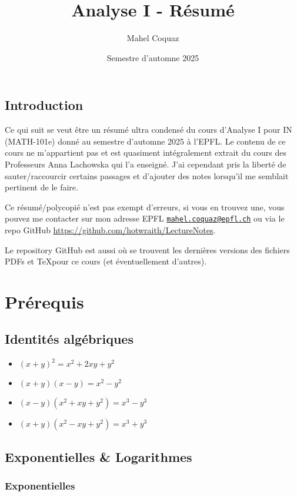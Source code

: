 \documentclass[10pt,a4paper]{book}
\title{Analyse I \vspace{0.2cm} - Résumé}
\author{Mahel Coquaz}
\date{Semestre d'automne 2025}
\begin{document}
\maketitle
\tableofcontents
\newpage

\section*{Introduction}

Ce qui suit se veut être un résumé ultra condensé du cours d'Analyse I pour IN (MATH-101e) donné au semestre d'automne 2025 à l'EPFL. Le contenu de ce cours ne m'appartient pas et est quasiment intégralement extrait du cours des Professeurs Anna Lachowska qui l'a enseigné. J'ai cependant pris la liberté de sauter/raccourcir certains passages et d'ajouter des notes lorsqu'il me semblait pertinent de le faire. \par
Ce résumé/polycopié n'est pas exempt d'erreurs, si vous en trouvez une, vous pouvez me contacter sur mon adresse EPFL \texttt{\href{mailto:mahel.coquaz@epfl.ch}{mahel.coquaz@epfl.ch}} ou via le repo GitHub \url{https://github.com/hotwraith/LectureNotes}. \par
Le repository GitHub est aussi où se trouvent les dernières versions des fichiers PDFs et \TeX pour ce cours (et éventuellement d'autres).

\chapter{Prérequis}

\section{Identités algébriques}

\begin{itemize}
\item $(x+y)^2 = x^2 + 2xy + y^2$
\item $(x+y)(x-y) = x^2-y^2$
\item $(x-y)(x^2+xy+y^2) = x^3-y^3$
\item $(x+y)(x^2-xy+y^2) = x^3+y^3$
\end{itemize}

\section{Exponentielles \& Logarithmes}

\subsection{Exponentielles}
\end{document}
